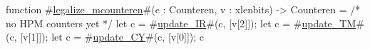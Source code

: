 function #\hyperref[sailRISCVzlegalizzezymcounteren]{legalize\_mcounteren}#(c : Counteren, v : xlenbits) -> Counteren = {
  /* no HPM counters yet */
  let c = #\hyperref[sailRISCVzupdatezyIR]{update\_IR}#(c, [v[2]]);
  let c = #\hyperref[sailRISCVzupdatezyTM]{update\_TM}#(c, [v[1]]);
  let c = #\hyperref[sailRISCVzupdatezyCY]{update\_CY}#(c, [v[0]]);
  c
}
